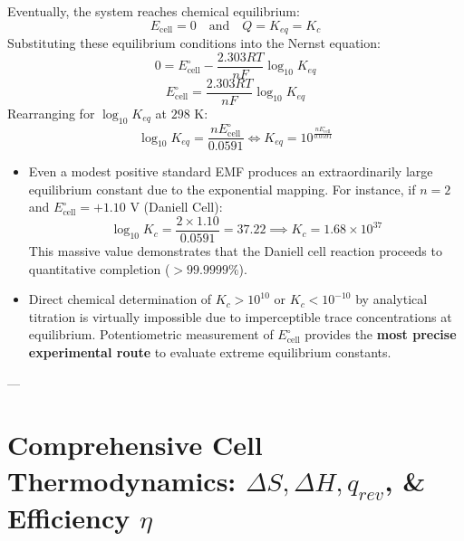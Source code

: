 Eventually, the system reaches chemical equilibrium:
\begin{equation}
    E_{\text{cell}} = 0 \quad \text{and} \quad Q = K_{eq} = K_c
\end{equation}
Substituting these equilibrium conditions into the Nernst equation:
\begin{equation}
    0 = E^\circ_{\text{cell}} - \frac{2.303 RT}{nF} \log_{10} K_{eq}
\end{equation}
\begin{equation}
    \boxed{E^\circ_{\text{cell}} = \frac{2.303 RT}{nF} \log_{10} K_{eq}}
\end{equation}
Rearranging for $\log_{10} K_{eq}$ at $298\text{ K}$:
\begin{equation}
    \boxed{\log_{10} K_{eq} = \frac{n E^\circ_{\text{cell}}}{0.0591}} \iff \boxed{K_{eq} = 10^{\frac{n E^\circ_{\text{cell}}}{0.0591}}}
\end{equation}

\begin{conceptbox}
\begin{itemize}[leftmargin=*]
    \item Even a modest positive standard EMF produces an extraordinarily large equilibrium constant due to the exponential mapping. For instance, if $n = 2$ and $E^\circ_{\text{cell}} = +1.10\text{ V}$ (Daniell Cell):
    \begin{equation*}
        \log_{10} K_c = \frac{2 \times 1.10}{0.0591} = 37.22 \implies K_c = 1.68 \times 10^{37}
    \end{equation*}
    This massive value demonstrates that the Daniell cell reaction proceeds to quantitative completion ($> 99.9999\%$).
    \item Direct chemical determination of $K_c > 10^{10}$ or $K_c < 10^{-10}$ by analytical titration is virtually impossible due to imperceptible trace concentrations at equilibrium. Potentiometric measurement of $E^\circ_{\text{cell}}$ provides the \textbf{most precise experimental route} to evaluate extreme equilibrium constants.
\end{itemize}
\end{conceptbox}

---

\section{Comprehensive Cell Thermodynamics: $\Delta S, \Delta H, q_{rev}$, \& Efficiency $\eta$}

